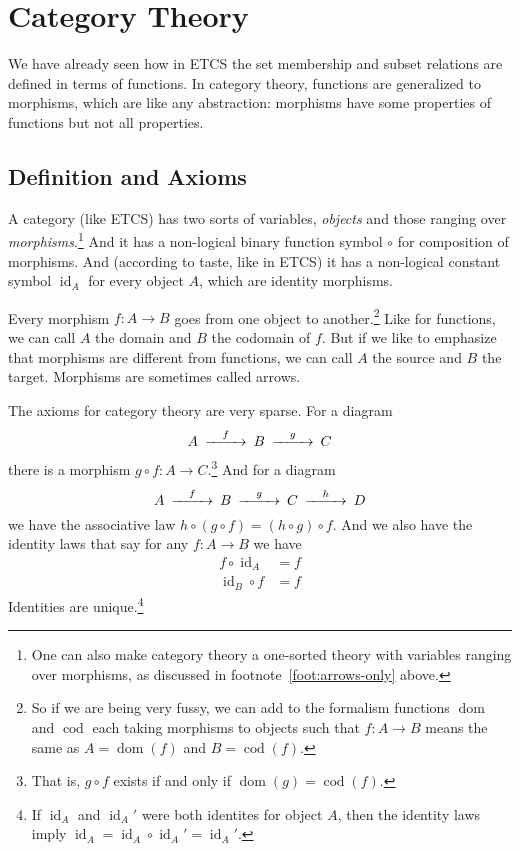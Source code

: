 \documentclass[11pt]{article}
\DeclareMathOperator{\idfun}{id}
\DeclareMathOperator{\dom}{dom}
\DeclareMathOperator{\cod}{cod}
\begin{document}
\section{Category Theory}
\label{sec:category}

We have already seen how in ETCS the set membership and subset relations are
defined in terms of functions.  In category theory, functions are generalized
to morphisms, which are like any abstraction: morphisms have some properties of
functions but not all properties.

\subsection{Definition and Axioms}

A category (like ETCS) has two sorts of variables,
\emph{objects} and those ranging over \emph{morphisms}.\footnote{One can also
make category theory a one-sorted theory with variables ranging over morphisms,
as discussed in footnote~\ref{foot:arrows-only} above.}
And it has a non-logical binary function
symbol $\circ$ for composition of morphisms.  And (according to taste, like
in ETCS) it has
a non-logical constant symbol $\idfun_A$ for every object $A$,
which are identity morphisms.

Every morphism $f : A \to B$ goes from one object to another.\footnote{So
if we are being very fussy, we can add to the formalism functions $\dom$
and $\cod$ each taking morphisms to objects such that $f : A \to B$ means
the same as $A = \dom(f)$ and $B = \cod(f)$.}
Like for functions, we can call $A$ the domain and $B$ the codomain of $f$.
But if we like to emphasize that morphisms are different from functions,
we can call $A$ the source and $B$ the target.
Morphisms are sometimes called arrows.

The axioms for category theory are very sparse.  For a diagram
\begin{equation} \label{diag:abc}
\begin{CD}
   A @>f>> B @>g>> C
\end{CD}
\end{equation}
there is a morphism $g \circ f : A \to C$.\footnote{That is,
$g \circ f$ exists if and only if $\dom(g) = \cod(f)$.}  And for a diagram
$$
\begin{CD}
   A @>f>> B @>g>> C @>h>> D
\end{CD}
$$
we have the associative law $h \circ (g \circ f) = (h \circ g) \circ f$.
And we also have the identity laws that say for any $f : A \to B$ we have
\begin{subequations}
\begin{align}
    f \circ \idfun_A & = f
    \label{eq:identity}
    \\
    \idfun_B \circ f & = f
    \label{eq:identity-too}
\end{align}
\end{subequations}
Identities are unique.\footnote{If $\idfun_A$ and $\idfun_A'$ were
both identites for object $A$, then the identity laws imply
$\idfun_A = \idfun_A \circ \idfun_A' = \idfun_A'$.\label{foot:identity}}
\end{document}
